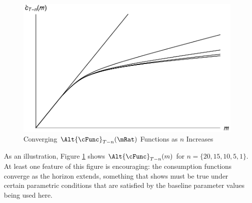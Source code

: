 \documentclass[titlepage]{\econtex}
\begin{document}
\hypertarget{PlotCFuncsConverge}{}
\begin{figure}
  \includegraphics{./Figures/PlotCFuncsConverge}
  \caption{Converging $\Alt{\cFunc}_{T-n}({\mRat})$ Functions as $n$ Increases}
  \label{fig:PlotCFuncsConverge}
\end{figure}


As an illustration, Figure \ref{fig:PlotCFuncsConverge} shows
$\Alt{\cFunc}_{T-n}({m})$ for $n=\{20,15,10,5,1\}$.  At least one
feature of this figure is encouraging: the consumption functions
converge as the horizon extends, something that \cite{BufferStockTheory}
shows must be true under certain parametric conditions that are
satisfied by the baseline parameter values being used here.
\end{document}
